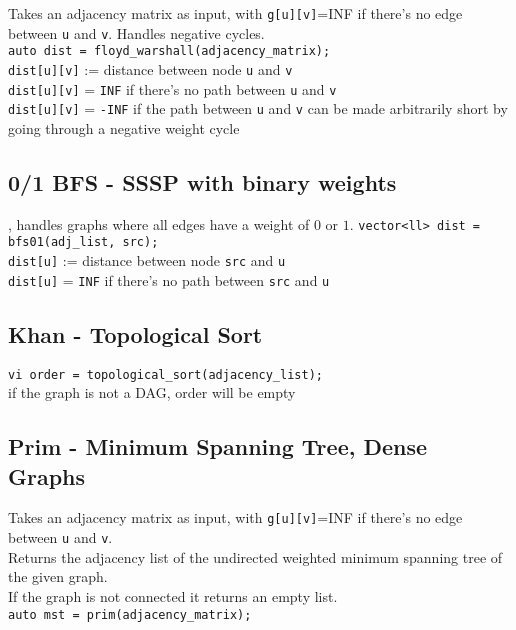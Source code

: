 Takes an adjacency matrix as input, with \verb|g[u][v]|=INF if there's no edge between \verb|u| and \verb|v|. Handles negative cycles. \\
\verb|auto dist = floyd_warshall(adjacency_matrix);| \\
\verb|dist[u][v]| := distance between node \verb|u| and \verb|v| \\
\verb|dist[u][v]| = \verb|INF| if there's no path between \verb|u| and \verb|v| \\
\verb|dist[u][v]| = \verb|-INF| if the path between \verb|u| and \verb|v| can be made arbitrarily short by going through a negative weight cycle


\subsection{0/1 BFS - SSSP with binary weights}
, handles graphs where all edges have a weight of $0$ or $1$.
\verb|vector<ll> dist = bfs01(adj_list, src);| \\
\verb|dist[u]| := distance between node \verb|src| and \verb|u| \\
\verb|dist[u]| = \verb|INF| if there's no path between \verb|src| and \verb|u|


\subsection{Khan - Topological Sort}

\verb|vi order = topological_sort(adjacency_list);| \\
if the graph is not a DAG, order will be empty



\subsection{Prim - Minimum Spanning Tree, Dense Graphs}

Takes an adjacency matrix as input, with \verb|g[u][v]|=INF if there's no edge between \verb|u| and \verb|v|. \\
Returns the adjacency list of the undirected weighted minimum spanning tree of the given graph. \\
If the graph is not connected it returns an empty list. \\
\verb|auto mst = prim(adjacency_matrix);| \\



